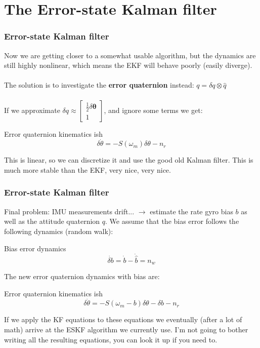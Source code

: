 \documentclass{beamer}
\begin{document}
\section{The Error-state Kalman filter}

\begin{frame}
    \frametitle{Error-state Kalman filter}
    Now we are getting closer to a somewhat usable algorithm, but the dynamics are still highly nonlinear, which means the EKF will behave poorly (easily diverge).\\~\\

    The solution is to investigate the \textbf{error quaternion} instead: $q=\delta q \otimes \hat{q}$\\~\\

    If we approximate $\delta q \approx \left[\begin{array}{c}{\frac{1}{2} \delta \boldsymbol{\theta}} \\ {1}\end{array}\right]$, and ignore some terms we get:
        \begin{block}{Error quaternion kinematics ish}
            \begin{equation}
                \delta \dot{\theta}=-S\left(\omega_{m}\right) \delta \theta-n_r
            \end{equation}
        \end{block}
    This is linear, so we can discretize it and use the good old Kalman filter. This is much more stable than the EKF, very nice, very nice.
\end{frame}


\begin{frame}
    \frametitle{Error-state Kalman filter}
    Final problem: IMU measurements drift... $\rightarrow$ estimate the rate gyro bias $b$ as well as the attitude quaternion $q$. We assume that the bias error follows the following dynamics (random walk):
    \begin{block}{Bias error dynamics}
        \begin{equation}
            \dot{\delta b}=\dot{b}-\dot{\hat{b}}=n_{w}
        \end{equation}
    \end{block}
    The new error quaternion dynamics with bias are:
    \begin{block}{Error quaternion kinematics ish}
        \begin{equation}
            \delta \dot{\theta}=-S\left(\omega_{m}-b\right) \delta \theta-\delta b-n_r
        \end{equation}
    \end{block}
    If we apply the KF equations to these equations we eventually (after a lot of math) arrive at the ESKF algorithm we currently use. I'm not going to bother writing all the resulting equations, you can look it up if you need to.
\end{frame}
\end{document}
